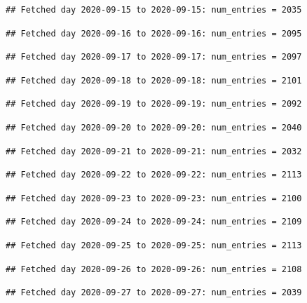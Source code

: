 \documentclass[]{article}
\begin{document}
\begin{verbatim}
## Fetched day 2020-09-15 to 2020-09-15: num_entries = 2035
\end{verbatim}

\begin{verbatim}
## Fetched day 2020-09-16 to 2020-09-16: num_entries = 2095
\end{verbatim}

\begin{verbatim}
## Fetched day 2020-09-17 to 2020-09-17: num_entries = 2097
\end{verbatim}

\begin{verbatim}
## Fetched day 2020-09-18 to 2020-09-18: num_entries = 2101
\end{verbatim}

\begin{verbatim}
## Fetched day 2020-09-19 to 2020-09-19: num_entries = 2092
\end{verbatim}

\begin{verbatim}
## Fetched day 2020-09-20 to 2020-09-20: num_entries = 2040
\end{verbatim}

\begin{verbatim}
## Fetched day 2020-09-21 to 2020-09-21: num_entries = 2032
\end{verbatim}

\begin{verbatim}
## Fetched day 2020-09-22 to 2020-09-22: num_entries = 2113
\end{verbatim}

\begin{verbatim}
## Fetched day 2020-09-23 to 2020-09-23: num_entries = 2100
\end{verbatim}

\begin{verbatim}
## Fetched day 2020-09-24 to 2020-09-24: num_entries = 2109
\end{verbatim}

\begin{verbatim}
## Fetched day 2020-09-25 to 2020-09-25: num_entries = 2113
\end{verbatim}

\begin{verbatim}
## Fetched day 2020-09-26 to 2020-09-26: num_entries = 2108
\end{verbatim}

\begin{verbatim}
## Fetched day 2020-09-27 to 2020-09-27: num_entries = 2039
\end{verbatim}
\end{document}
